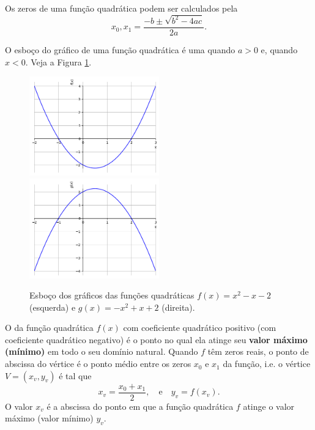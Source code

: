 Os zeros de uma função quadrática podem ser calculados pela 
\begin{equation}\label{eq:Bhaskara}
  x_0, x_1 = \frac{-b \pm \sqrt{b^2 - 4ac}}{2a}.
\end{equation}


O esboço do gráfico de uma função quadrática é uma  quando $a > 0$ e,  quando $x < 0$. Veja a Figura \ref{fig:funquad_concavidade}.

\begin{figure}[H]
  \centering
  \includegraphics[width=0.5\textwidth]{./cap_funcao/dados/fig_funquad_concavidade/fig_funquad_concavidade_cima}~
    \includegraphics[width=0.5\textwidth]{./cap_funcao/dados/fig_funquad_concavidade/fig_funquad_concavidade_baixo}
  \caption{Esboço dos gráficos das funções quadráticas $f(x) = x^2-x-2$ (esquerda) e $g(x)=-x^2+x+2$ (direita).}
  \label{fig:funquad_concavidade}
\end{figure}

O  da função quadrática $f(x)$ com coeficiente quadrático positivo (com coeficiente quadrático negativo) é o ponto no qual ela atinge seu {\bf valor máximo (mínimo)} em todo o seu domínio natural. Quando $f$ têm zeros reais, o ponto de abscissa do vértice é o ponto médio entre os zeros $x_0$ e $x_1$ da função, i.e. o vértice $V = (x_v, y_v)$ é tal que
\begin{equation}
  x_v = \frac{x_0 + x_1}{2},\quad\text{e}\quad y_v = f(x_v). 
\end{equation}
O valor $x_v$ é a abscissa do ponto em que a função quadrática $f$ atinge o valor máximo (valor mínimo) $y_v$.


